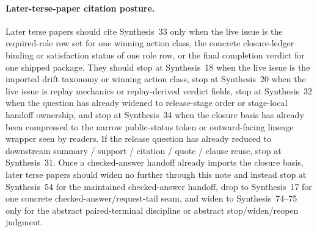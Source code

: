 \documentclass[11pt]{article}
\begin{document}
\paragraph{Later-terse-paper citation posture.}
Later terse papers should cite Synthesis~33 only when the live issue is the required-role row set for one winning action class, the concrete closure-ledger binding or satisfaction status of one role row, or the final completion verdict for one shipped package. They should stop at Synthesis~18 when the live issue is the imported drift taxonomy or winning action class, stop at Synthesis~20 when the live issue is replay mechanics or replay-derived verdict fields, stop at Synthesis~32 when the question has already widened to release-stage order or stage-local handoff ownership, and stop at Synthesis~34 when the closure basis has already been compressed to the narrow public-status token or outward-facing lineage wrapper seen by readers. If the release question has already reduced to downstream summary / support / citation / quote / clause reuse, stop at Synthesis~31. Once a checked-answer handoff already imports the closure basis, later terse papers should widen no further through this note and instead stop at Synthesis~54 for the maintained checked-answer handoff, drop to Synthesis~17 for one concrete checked-answer/request-tail seam, and widen to Synthesis~74--75 only for the abstract paired-terminal discipline or abstract stop/widen/reopen judgment.\cite{series:planstateequiv,series:auditorreplay,series:releasespine,series:statusenvelopes,series:downstreamnormalforms,series:challengeanswerreviewmenus,series:pairedterminalcitationdiscipline,series:pairedterminalcutoverrules,series:workedexample}
\end{document}
